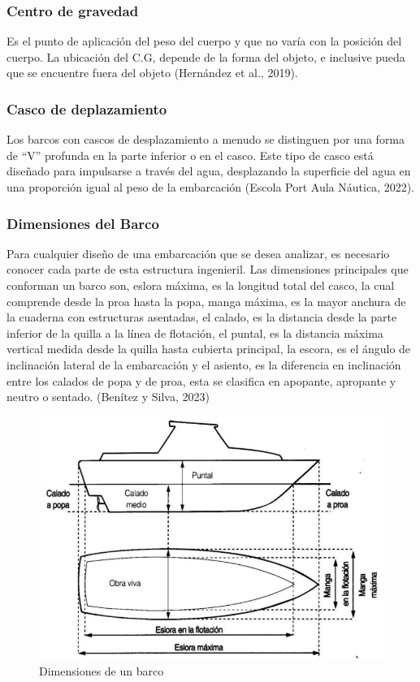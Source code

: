 \documentclass[letterpaper]{article}
\begin{document}
\subsubsection{Centro de gravedad}
\setlength{\parindent}{18pt}
Es el punto de aplicación del peso del cuerpo y que no varía con la posición del cuerpo. La ubicación del C.G, 
depende de la forma del objeto, e inclusive pueda que se encuentre fuera del objeto (Hernández et al., 2019).

\subsubsection{Casco de deplazamiento}
\setlength{\parindent}{18pt}
Los barcos con cascos de desplazamiento a menudo se distinguen por una forma de ``V'' profunda en la parte 
inferior o en el casco. Este tipo de casco está diseñado para impulsarse a través del agua, desplazando 
la superficie del agua en una proporción igual al peso de la embarcación (Escola Port Aula Náutica, 2022).
\subsubsection{Dimensiones del Barco}
\setlength{\parindent}{18pt}
Para cualquier diseño de una embarcación que se desea analizar, es necesario conocer cada parte de esta 
estructura ingenieril. Las dimensiones principales que conforman un barco son, eslora máxima, es la longitud 
total del casco, la cual comprende desde la proa hasta la popa, manga máxima, es la mayor anchura de la 
cuaderna con estructuras asentadas, el calado, es la distancia desde la parte inferior de la quilla a la 
línea de flotación, el puntal, es la distancia máxima vertical medida desde la quilla hasta cubierta 
principal, la escora, es el ángulo de inclinación lateral de la embarcación y el asiento, es la diferencia
 en inclinación entre los calados de popa y de proa, esta se clasifica en apopante, 
 apropante y neutro o sentado. (Benítez y Silva, 2023)
 \begin{figure}[h]
	\centering
	\includegraphics[width=0.5 \textwidth]{dimensionestemporal.jpg}
	\caption{ Dimensiones de un barco}
	\label{fig:imagen00}
\end{figure}
\end{document}
